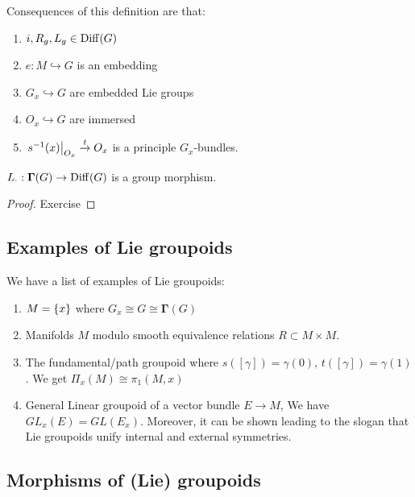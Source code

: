 \documentclass{article}
\begin{document}
Consequences of this definition are that:
\begin{enumerate}
    \item $i,R_g,L_g \in \operatorname{Diff}(G)$
    \item $e : M \hookrightarrow G$ is an embedding
    \item $G_x \hookrightarrow G$ are embedded Lie groups
    \item $O_x \hookrightarrow G$ are immersed 
    \item $\left. s^{-1}(x) \right\rvert_{O_x} \overset{t}{\to} O_x$ is a principle $G_x$-bundles.
\end{enumerate}

\begin{prop}
$L_\cdot : \bm{\Gamma}(G) \to \operatorname{Diff}(G)$ is a group morphism.
\end{prop}
\begin{proof}
Exercise
\end{proof}

\subsection{Examples of Lie groupoids}
We have a list of examples of Lie groupoids:
\begin{enumerate}
    \item $M = \left\{ x \right\}$ where $G_x \cong G \cong \bm{\Gamma}(G)$
    \item Manifolds $M$ modulo smooth equivalence relations $R \subset M \times M$.
    \item The fundamental/path groupoid 
    where $s([\gamma]) = \gamma(0), \, t([\gamma]) = \gamma(1)$. We get $\Pi_x(M) \cong \pi_1(M,x)$
    \item General Linear groupoid of a vector bundle $E \to M$, 
    We have $GL_x(E) = GL(E_x)$. Moreover, it can be shown 
    leading to the slogan that Lie groupoids unify internal and external symmetries. 
\end{enumerate}

\subsection{Morphisms of (Lie) groupoids}
\end{document}
